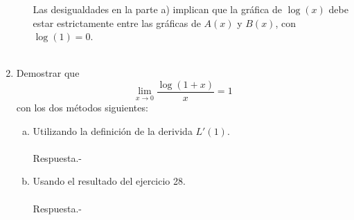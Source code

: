 \begin{enumerate}[\bfseries 1.]
\begin{enumerate}[a)]
		Las desigualdades en la parte a) implican que la gráfica de $\log(x)$ debe estar estrictamente entre las gráficas de $A(x)$ y $B(x)$, con $\log(1)=0$.\\\\

	\end{enumerate}

    \item Demostrar que 
	$$\lim_{x\to 0}\dfrac{\log(1+x)}{x}=1$$
	con los dos métodos siguientes:
	\begin{enumerate}[a)]

	    \item Utilizando la definición de la derivida $L'(1)$.\\\\
		Respuesta.-\; 

	    \item Usando el resultado del ejercicio 28.\\\\
		Respuesta.-\;

	\end{enumerate}



\end{enumerate}


